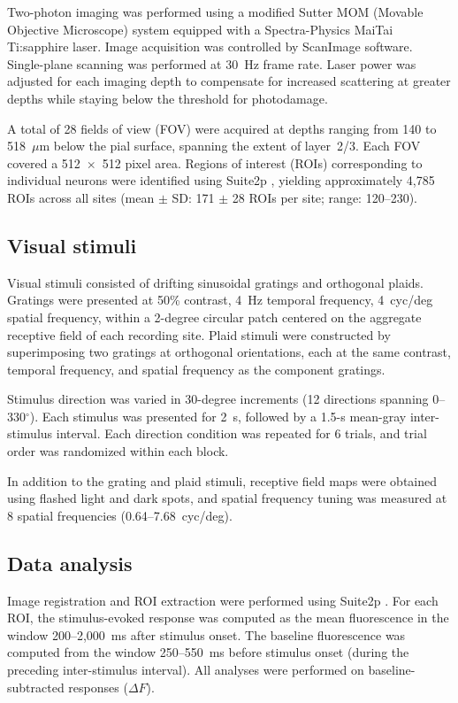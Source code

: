 \documentclass[11pt,letterpaper]{article}
\begin{document}
Two-photon imaging was performed using a modified Sutter MOM (Movable
Objective Microscope) system equipped with a Spectra-Physics MaiTai
Ti:sapphire laser. Image acquisition was controlled by ScanImage software.
Single-plane scanning was performed at 30~Hz frame rate. Laser power was
adjusted for each imaging depth to compensate for increased scattering at
greater depths while staying below the threshold for photodamage.

A total of 28 fields of view (FOV) were acquired at depths ranging from
140 to 518~$\mu$m below the pial surface, spanning the extent of layer~2/3.
Each FOV covered a 512~$\times$~512 pixel area. Regions of interest (ROIs)
corresponding to individual neurons were identified using Suite2p
\citep{pachitariu2017}, yielding approximately 4,785 ROIs across all sites
(mean $\pm$ SD: 171 $\pm$ 28 ROIs per site; range: 120--230).

\subsection{Visual stimuli}

Visual stimuli consisted of drifting sinusoidal gratings and orthogonal plaids.
Gratings were presented at 50\% contrast, 4~Hz temporal frequency, 4~cyc/deg
spatial frequency, within a 2-degree circular patch centered on the aggregate
receptive field of each recording site. Plaid stimuli were constructed by
superimposing two gratings at orthogonal orientations, each at the same
contrast, temporal frequency, and spatial frequency as the component gratings.

Stimulus direction was varied in 30-degree increments (12 directions spanning
0--330$^{\circ}$). Each stimulus was presented for 2~s, followed by a 1.5-s
mean-gray inter-stimulus interval. Each direction condition was repeated for 6
trials, and trial order was randomized within each block.

In addition to the grating and plaid stimuli, receptive field maps were
obtained using flashed light and dark spots, and spatial frequency tuning was
measured at 8 spatial frequencies (0.64--7.68~cyc/deg).

\subsection{Data analysis}

Image registration and ROI extraction were performed using Suite2p
\citep{pachitariu2017}. For each ROI, the stimulus-evoked response was
computed as the mean fluorescence in the window 200--2,000~ms after stimulus
onset. The baseline fluorescence was computed from the window 250--550~ms
before stimulus onset (during the preceding inter-stimulus interval). All
analyses were performed on baseline-subtracted responses ($\Delta F$).
\end{document}
